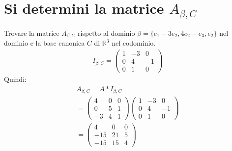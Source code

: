 \documentclass{article}
\begin{document}
\section{Si determini la matrice $A_{\beta,C}$ }
Trovare la matrice $A_{\beta,C}$ rispetto al dominio $\beta=\{e_1-3e_2,4e_2-e_3,e_2\}$ nel dominio e la base canonica $C$ di $\mathbb{R}^3$ nel codominio.
\begin{align*}
 I_{\beta,C}=\begin{pmatrix}
    1&-3&0\\
    0&4&-1\\
    0&1&0
 \end{pmatrix}   
\end{align*}
Quindi:
\begin{align*}
    A_{\beta,C}=A*I_{\beta,C}\\
    =\begin{pmatrix}
        4&0&0\\
        0&5&1\\
        -3&4&1
    \end{pmatrix}\begin{pmatrix}
        1&-3&0\\
        0&4&-1\\
        0&1&0
     \end{pmatrix}  \\
     =\begin{pmatrix}
        4&0&0\\
        -15&21&5\\
        -15&15&4
     \end{pmatrix}
\end{align*}
\end{document}
